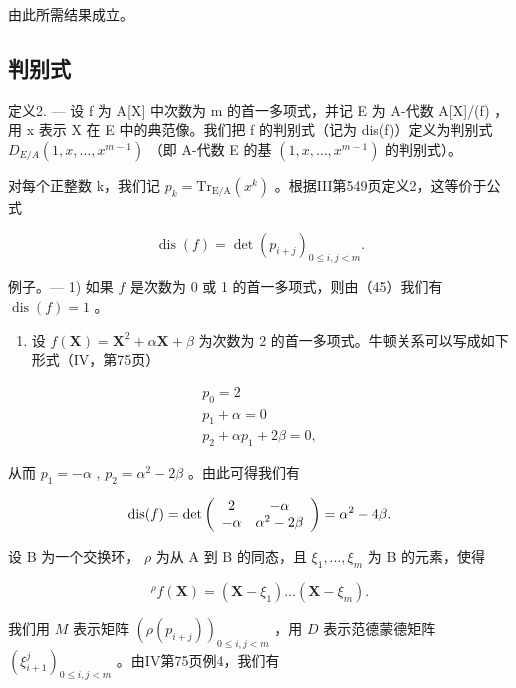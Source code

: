 由此所需结果成立。

\subsection{判别式}

定义2. --- 设 f 为 A{[}X{]} 中次数为 m 的首一多项式，并记 E 为 A-代数 A{[}X{]}/(f) ，用 x 表示 X 在 E 中的典范像。我们把 f 的判别式（记为 dis(f)）定义为判别式 \(D_{E/A}(1, x, \ldots, x^{m-1})\) （即 A-代数 E 的基 \((1, x, \ldots, x^{m-1})\) 的判别式）。

对每个正整数 k，我们记 \(p_{k} = \mathrm{Tr}_{\mathrm{E}/\mathrm{A}}(x^{k})\) 。根据III第549页定义2，这等价于公式

\[
\operatorname{dis} (f) = \det \left(p _ {i + j}\right) _ {0 \leqslant i, j <   m}.\tag{45}
\]

例子。--- 1) 如果 \(f\) 是次数为 0 或 1 的首一多项式，则由（45）我们有 \(\operatorname{dis}(f) = 1\) 。

\begin{enumerate}
\def\labelenumi{\arabic{enumi})}
\setcounter{enumi}{1}
\tightlist
\item
  设 \(f(\mathbf{X}) = \mathbf{X}^2 + \alpha \mathbf{X} + \beta\) 为次数为 2 的首一多项式。牛顿关系可以写成如下形式（IV，第75页）
\end{enumerate}

\[
\begin{array}{c} p _ {0} = 2 \\ p _ {1} + \alpha = 0 \\ p _ {2} + \alpha p _ {1} + 2 \beta = 0, \end{array}
\]

从而 \(p_1 = -\alpha\) , \(p_2 = \alpha^2 - 2\beta\) 。由此可得我们有

\[
\operatorname{dis} (f) = \det \left( \begin{array}{c c} 2 & - \alpha \\ - \alpha & \alpha^ {2} - 2 \beta \end{array} \right) = \alpha^ {2} - 4 \beta .
\]

设 B 为一个交换环， \(\rho\) 为从 A 到 B 的同态，且 \(\xi_{1}, \ldots, \xi_{m}\) 为 B 的元素，使得

\[
{ } ^ { \rho } f ( \mathbf { X } ) = ( \mathbf { X } - \xi _ { 1 } ) \dots ( \mathbf { X } - \xi _ { m } ) .
\]

我们用 \(M\) 表示矩阵 \((\rho(p_{i+j}))_{0 \leqslant i,j < m}\) ，用 \(D\) 表示范德蒙德矩阵 \((\xi_{i+1}^{j})_{0 \leqslant i,j < m}\) 。由IV第75页例4，我们有

